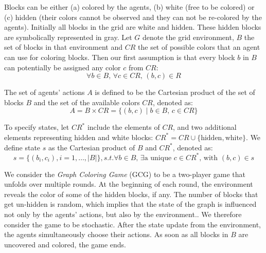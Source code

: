 \begin{flushleft}
\begin{flushleft}
        Blocks can be either (a) colored by the agents, (b) white (free to be colored) or (c) hidden (their colors cannot be observed and they can not be re-colored by the agents). Initially all blocks in the grid are white and hidden. These hidden blocks are symbolically represented in gray. Let $G$ denote the grid environment, $B$ the set of blocks in that environment and $CR$ the set of possible colors that an agent can use for coloring blocks. Then our first assumption is that every block $b$ in $B$ can potentially be assigned any color $c$ from $CR$:
        \begin{equation}
            \forall b \in B, \, \forall c \in CR, \, (b, c) \in R 
            \label{eq:bc}
        \end{equation}

        The set of agents' actions $A$ is defined to be the Cartesian product of the set of blocks $B$ and the set of the available colors $CR$, denoted as:
        \begin{equation}
            A = B \times CR = \{(b, c) \mid b \in B, \, c \in CR\} 
            \label{eq:action_space}
        \end{equation}

        To specify states, let $CR^*$ include the elements of $CR$, and two additional elements representing hidden and white blocks: $CR^* = CR \cup \{\text{hidden}, \text{white}\}$. We define state $s$ as the Cartesian product of $B$ and $CR^*$, denoted as:
        \begin{equation}
            s = \{(b_i, c_i), i=1, \dots, |B|\}, s.t. \forall b \in B, \, \exists \text{a unique } c \in CR^*\text{, with } (b,c) \in s
            \label{eq:state}
        \end{equation}

        We consider the \emph{Graph Coloring Game} (GCG) to be a two-player game that unfolds over multiple rounds. At the beginning of each round, the environment reveals the color of some of the hidden blocks, if any. The number of blocks that get un-hidden is random, which implies that the state of the graph is influenced not only by the agents' actions, but also by the environment.. We therefore consider the game to be stochastic. After the state update from the environment, the agents simultaneously choose their actions. As soon as all blocks in $B$ are uncovered and colored, the game ends.
    
    \end{flushleft}


\end{flushleft}
